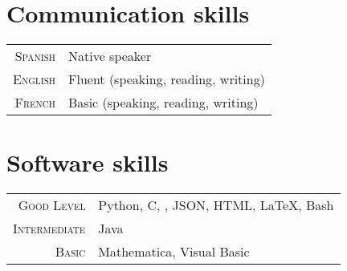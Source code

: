 \documentclass{my_cv}
\begin{document}
\begin{multicols}{2}	
\section{Communication skills}
\begin{tabular}{@{}r|l}
	\textsc{Spanish} & Native speaker \\
	\textsc{English} & Fluent (speaking, reading, writing) \\
	\textsc{French} & Basic (speaking, reading, writing)
\end{tabular}

\section{Software skills}
\begin{tabular}{@{}r|p{5cm}}
	\textsc{Good Level} & Python, C, \faGit, JSON, HTML, \LaTeX, Bash \\
	\textsc{Intermediate} & Java \\
	\textsc{Basic} & Mathematica, Visual Basic \\
\end{tabular}
\end{multicols}
	
\end{document}
